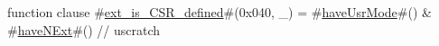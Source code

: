 function clause #\hyperref[sailRISCVzextzyiszyCSRzydefined]{ext\_is\_CSR\_defined}#(0x040, _) = #\hyperref[sailRISCVzhaveUsrMode]{haveUsrMode}#() & #\hyperref[sailRISCVzhaveNExt]{haveNExt}#() // uscratch
